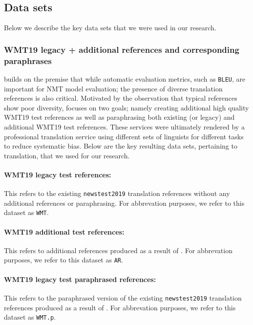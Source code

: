 \documentclass[11pt,a4paper]{article}
\begin{document}
\subsection{Data sets}

Below we describe the key data sets that we were used in our research.

\subsubsection{WMT19 legacy + additional references and corresponding paraphrases}

\citet{freitag-bleu-paraphrase-references-2020} builds on the premise that while automatic evaluation metrics, such as \texttt{BLEU}, are important for NMT model evaluation; the presence of diverse translation references is also critical. Motivated by the observation that typical references show poor diversity, \citet{freitag-bleu-paraphrase-references-2020} focuses on two goals; namely creating additional high quality WMT19 test references as well as paraphrasing both existing (or legacy) and additional WMT19 test references. These services were ultimately rendered by a professional translation service using different sets of linguists for different tasks to reduce systematic bias. Below are the key resulting data sets, pertaining to translation, that we used for our research.

\paragraph{WMT19 legacy test references:} This refers to the existing \texttt{newstest2019} translation references without any additional references or paraphrasing. For abbrevation purposes, we refer to this dataset as \texttt{WMT}. 

\paragraph{WMT19 additional test references:} This refers to additional references produced as a result of \citet{freitag-bleu-paraphrase-references-2020}. For abbrevation purposes, we refer to this dataset as \texttt{AR}. 

\paragraph{WMT19 legacy test paraphrased references:} This refers to the paraphrased version of the existing \texttt{newstest2019} translation references produced as a result of \citet{freitag-bleu-paraphrase-references-2020}. For abbrevation purposes, we refer to this dataset as \texttt{WMT.p}. 
\end{document}
